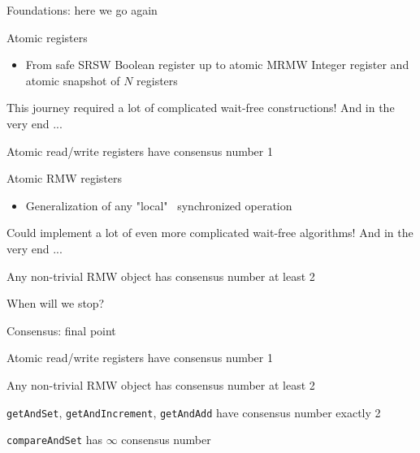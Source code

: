 \begin{frame}[fragile]{Foundations: here we go again}

Atomic registers
\begin{itemize}
  \item From safe SRSW Boolean register \pause up to atomic MRMW Integer register \pause and atomic snapshot of $N$ registers
\end{itemize}
\pause
This journey required a lot of complicated wait-free constructions! \pause And in the very end ... 

\pause 

\begin{theorem}
  Atomic read/write registers have consensus number 1
\end{theorem}

\pause
Atomic RMW registers
\begin{itemize}
  \item Generalization of any "local" \ synchronized operation 
\end{itemize}
\pause Could implement a lot of even more complicated wait-free algorithms! \pause And in the very end ... 

\pause

\begin{theorem}
Any non-trivial RMW object has consensus number at least 2
\end{theorem}

\pause

When will we stop?

\end{frame}


\begin{frame}[fragile]{Consensus: final point}

\begin{theorem}
  Atomic read/write registers have consensus number 1
\end{theorem}

\begin{theorem}
Any non-trivial RMW object has consensus number at least 2
\end{theorem}

\pause

\begin{theorem}
 \texttt{getAndSet}, \texttt{getAndIncrement}, \texttt{getAndAdd} have consensus number exactly 2
\end{theorem}

\pause

\begin{theorem}
\texttt{compareAndSet} has $\infty$ consensus number
\end{theorem}

\end{frame}


